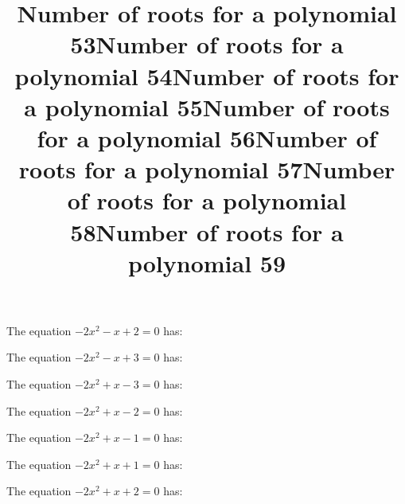 \documentclass{article}
\begin{document}
\begin{category}
\begin{question}[multichoice]
\end{question}
\begin{question}[multichoice]
\title{Number of roots for a polynomial 53}
The equation $- 2 x^{2} - x + 2=0$ has:



\end{question}
\begin{question}[multichoice]
\title{Number of roots for a polynomial 54}
The equation $- 2 x^{2} - x + 3=0$ has:



\end{question}
\begin{question}[multichoice]
\title{Number of roots for a polynomial 55}
The equation $- 2 x^{2} + x - 3=0$ has:



\end{question}
\begin{question}[multichoice]
\title{Number of roots for a polynomial 56}
The equation $- 2 x^{2} + x - 2=0$ has:



\end{question}
\begin{question}[multichoice]
\title{Number of roots for a polynomial 57}
The equation $- 2 x^{2} + x - 1=0$ has:



\end{question}
\begin{question}[multichoice]
\title{Number of roots for a polynomial 58}
The equation $- 2 x^{2} + x + 1=0$ has:



\end{question}
\begin{question}[multichoice]
\title{Number of roots for a polynomial 59}
The equation $- 2 x^{2} + x + 2=0$ has:


\end{question}
\end{category}
\end{document}
